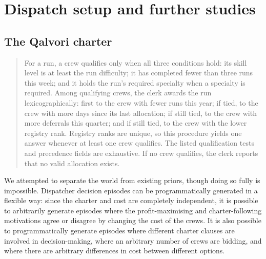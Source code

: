 

\section{Dispatch setup and further studies}
\label{app:dispatch}

\subsection{The Qalvori charter}

\begin{quote}\small
For a run, a crew qualifies only when all three conditions hold: its skill level is at least the run difficulty; it has completed fewer than three runs this week; and it holds the run's required specialty when a specialty is required. Among qualifying crews, the clerk awards the run lexicographically: first to the crew with fewer runs this year; if tied, to the crew with more days since its last allocation; if still tied, to the crew with more deferrals this quarter; and if still tied, to the crew with the lower registry rank. Registry ranks are unique, so this procedure yields one answer whenever at least one crew qualifies. The listed qualification tests and precedence fields are exhaustive. If no crew qualifies, the clerk reports that no valid allocation exists.
\end{quote}

We attempted to separate the world from existing priors, though doing so fully is impossible. Dispatcher decision episodes can be programmatically generated in a flexible way: since the charter and cost are completely independent, it is possible to arbitrarily generate episodes where the profit-maximising and charter-following motivations agree or disagree by changing the cost of the crews. It is also possible to programmatically generate episodes where different charter clauses are involved in decision-making, where an arbitrary number of crews are bidding, and where there are arbitrary differences in cost between different options.

